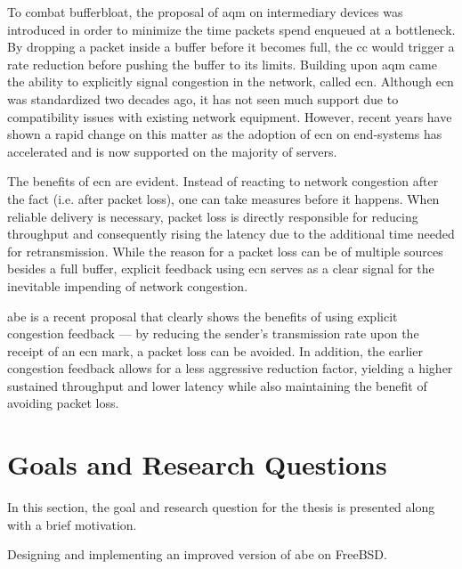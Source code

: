 To combat bufferbloat, the proposal of \gls{aqm} on intermediary devices was introduced in order to minimize the time packets spend enqueued at a bottleneck. By dropping a packet inside a buffer before it becomes full, the \gls{cc} would trigger a rate reduction before pushing the buffer to its limits. Building upon \gls{aqm} came the ability to explicitly signal congestion in the network, called \gls{ecn}. Although \gls{ecn} was standardized two decades ago, it has not seen much support due to compatibility issues with existing network equipment. However, recent years have shown a rapid change on this matter as the adoption of \gls{ecn} on end-systems has accelerated and is now supported on the majority of servers. \cite{enabling_internet-wide_ecn}

The benefits of \gls{ecn} are evident. Instead of reacting to network congestion after the fact (i.e. after packet loss), one can take measures before it happens. When reliable delivery is necessary, packet loss is directly responsible for reducing throughput and consequently rising the latency due to the additional time needed for retransmission. While the reason for a packet loss can be of multiple sources besides a full buffer, explicit feedback using \gls{ecn} serves as a clear signal for the inevitable impending of network congestion.

\gls{abe} \cite{abe} is a recent proposal that clearly shows the benefits of using explicit congestion feedback --- by reducing the sender's transmission rate upon the receipt of an \gls{ecn} mark, a packet loss can be avoided. In addition, the earlier congestion feedback allows for a less aggressive reduction factor, yielding a higher sustained throughput and lower latency while also maintaining the benefit of avoiding packet loss.









\section{Goals and Research Questions} \label{goals_and_research_questions}

In this section, the goal and research question for the thesis is presented along with a brief motivation.

\begin{statement}
    Designing and implementing an improved version of \gls{abe} on FreeBSD.
\end{statement}

